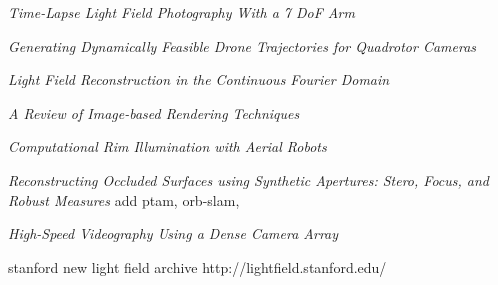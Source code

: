\documentclass[12pt]{report}
\begin{document}
\begin{thebibliography}{10}
	\emph{Time-Lapse Light Field Photography With a 7 DoF Arm}

	\emph{Generating Dynamically Feasible Drone Trajectories for Quadrotor Cameras}

	\emph{Light Field Reconstruction in the Continuous Fourier Domain}

	\emph{A Review of Image-based Rendering Techniques}

	\emph{Computational Rim Illumination with Aerial Robots}

	\emph{Reconstructing Occluded Surfaces using Synthetic Apertures: Stero, Focus, and Robust Measures}
	add ptam, orb-slam, 
	
	\emph{High-Speed Videography Using a Dense Camera Array}

stanford new light field archive http://lightfield.stanford.edu/

\end{thebibliography}
\end{document}
